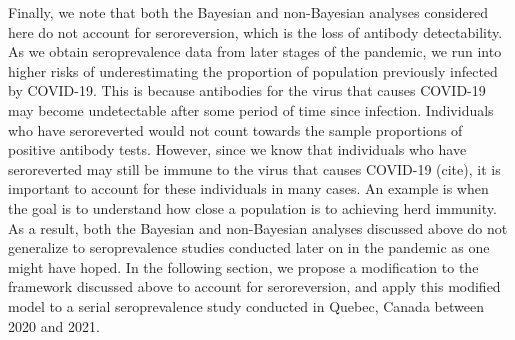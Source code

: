 Finally, we note that both the Bayesian and non-Bayesian analyses considered here do not account for seroreversion, which is the loss of antibody detectability. As we obtain seroprevalence data from later stages of the pandemic, we run into higher risks of underestimating the proportion of population previously infected by COVID-19. This is because antibodies for the virus that causes COVID-19 may become undetectable after some period of time since infection. Individuals who have seroreverted would not count towards the sample proportions of positive antibody tests. However, since we know that individuals who have seroreverted may still be immune to the virus that causes COVID-19 (cite), it is important to account for these individuals in many cases. An example is when the goal is to understand how close a population is to achieving herd immunity. As a result, both the Bayesian and non-Bayesian analyses discussed above do not generalize to seroprevalence studies conducted later on in the pandemic as one might have hoped. In the following section, we propose a modification to the framework discussed above to account for seroreversion, and apply this modified model to a serial seroprevalence study conducted in Quebec, Canada between 2020 and 2021.